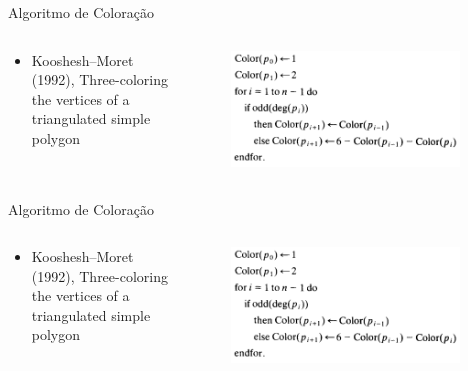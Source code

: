 \documentclass[aspectratio=169,usenames,dvipsnames]{beamer}
\begin{document}
\begin{frame}{Algoritmo de Coloração}
  \begin{columns}
    \begin{center}
      \begin{itemize}
        \item Kooshesh–Moret (1992), Three-coloring the vertices of a triangulated simple polygon
      \end{itemize}
    \end{center}
    \begin{center}
      \begin{figure}
        \includegraphics[width=0.95\textwidth]{figures/coloracao.png}
      \end{figure}
    \end{center}
  \end{columns}
\end{frame}

\begin{frame}{Algoritmo de Coloração}
  \begin{columns}
    \begin{center}
      \begin{itemize}
        \item Kooshesh–Moret (1992), Three-coloring the vertices of a triangulated simple polygon
      \end{itemize}
    \end{center}
    \begin{center}
      \begin{figure}
        \includegraphics[width=0.95\textwidth]{figures/coloracao.png}
      \end{figure}
    \end{center}
  \end{columns}
\end{frame}
\end{document}
